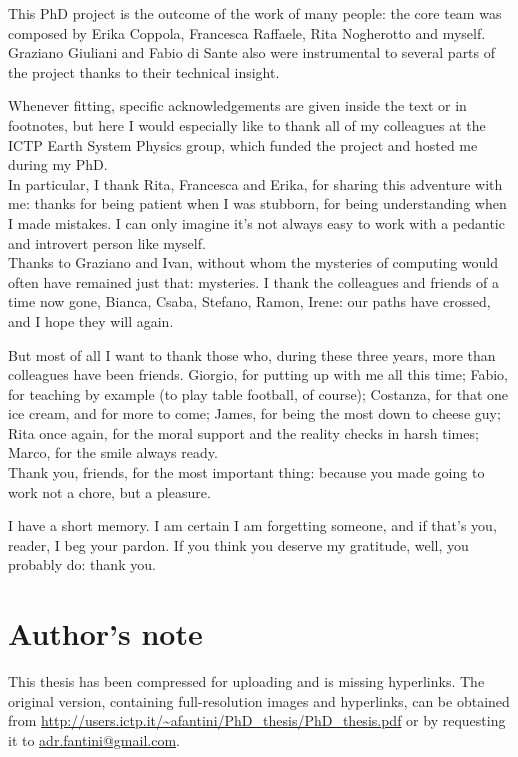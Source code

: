 \begin{acknowledgements}
\addchaptertocentry{\acknowledgementname} %
This PhD project is the outcome of the work of many people: the core team was composed by Erika Coppola, Francesca Raffaele, Rita Nogherotto and myself. Graziano Giuliani and Fabio di Sante also were instrumental to several parts of the project thanks to their technical insight. 

Whenever fitting, specific acknowledgements are given inside the text or in footnotes, but here I would especially like to thank all of my colleagues at the ICTP Earth System Physics group, which funded the project and hosted me during my PhD.\\
In particular, I thank Rita, Francesca and Erika, for sharing this adventure with me: thanks for being patient when I was stubborn, for being understanding when I made mistakes.
I can only imagine it's not always easy to work with a pedantic and introvert person like myself.\\
Thanks to Graziano and Ivan, without whom the mysteries of computing would often have remained just that: mysteries.
I thank the colleagues and friends of a time now gone, Bianca, Csaba, Stefano, Ramon, Irene: our paths have crossed, and I hope they will again.

But most of all I want to thank those who, during these three years, more than colleagues have been friends.
Giorgio, for putting up with me all this time; Fabio, for teaching by example (to play table football, of course); Costanza, for that one ice cream, and for more to come; James, for being the most down to cheese guy; Rita once again, for the moral support and the reality checks in harsh times; Marco, for the smile always ready.\\
Thank you, friends, for the most important thing: because you made going to work not a chore, but a pleasure. 

I have a short memory. I am certain I am forgetting someone, and if that's you, reader, I beg your pardon. If you think you deserve my gratitude, well, you probably do: thank you.

\newpage
\section*{Author's note}
This thesis has been compressed for uploading and is missing hyperlinks.
The original version, containing full-resolution images and hyperlinks, can be obtained from \url{http://users.ictp.it/~afantini/PhD_thesis/PhD_thesis.pdf} or by requesting it to \href{mailto:adr.fantini@gmail.com}{adr.fantini@gmail.com}.


\end{acknowledgements}